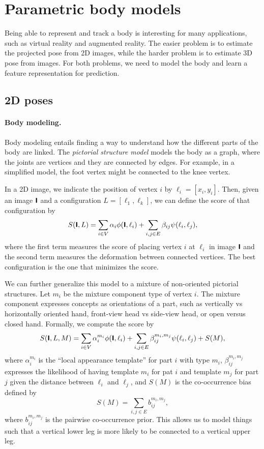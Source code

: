 \section{Parametric body models}

Being able to represent and track a body is interesting for many applications, such as virtual
reality and augmented reality. The easier problem is to estimate the projected pose from 2D images,
while the harder problem is to estimate 3D pose from images. For both problems, we need to model
the body and learn a feature representation for prediction.

\subsection{2D poses}

\paragraph{Body modeling.}

Body modeling entails finding a way to understand how the different parts of the body are linked.
The \textit{pictorial structure model} \citep{yang2011articulated} models the body as a graph,
where the joints are vertices and they are connected by edges. For example, in a simplified model,
the foot vertex might be connected to the knee vertex.

In a 2D image, we indicate the position of vertex $i$ by $\ell_i = [x_i, y_i]$. Then, given an
image $\bm{\mathsf{I}}$ and a configuration $L = [\ell_1, \ell_k]$, we can define the score of that
configuration by \[
    S(\bm{\mathsf{I}}, L) = \sum_{i \in V} \alpha_i \phi(\bm{\mathsf{I}}, \ell_i) + \sum_{i,j \in E} \beta_{ij} \psi(\ell_i, \ell_j),
\]
where the first term measures the score of placing vertex $i$ at $\ell_i$ in image $\bm{\mathsf{I}}$ and
the second term measures the deformation between connected vertices. The best configuration is the
one that minimizes the score.

We can further generalize this model to a mixture of non-oriented pictorial structures. Let $m_i$
be the mixture component type of vertex $i$. The mixture component expresses concepts as
orientations of a part, such as vertically vs horizontally oriented hand, front-view head vs
side-view head, or open versus closed hand. Formally, we compute the score by \[
    S(\bm{\mathsf{I}}, L, M) = \sum_{i \in V} \alpha_i^{m_i} \phi(\bm{\mathsf{I}}, \ell_i) + \sum_{i,j \in E} \beta_{ij}^{m_i,m_j} \psi(\ell_i, \ell_j)+ S(M),
\]
where $\alpha_i^{m_i}$ is the ``local appearance template'' for part $i$ with type $m_i$,
$\beta_{ij}^{m_i,m_j}$ expresses the likelihood of having template $m_i$ for pat $i$ and template
$m_j$ for part $j$ given the distance between $\ell_i$ and $\ell_j$, and $S(M)$ is the
co-occurrence bias defined by \[
    S(M) = \sum_{i,j\in E} b_{ij}^{m_i,m_j},
\]
where $b_{ij}^{m_i,m_j}$ is the pairwise co-occurrence prior. This allows us to model things such
that a vertical lower leg is more likely to be connected to a vertical upper leg.

